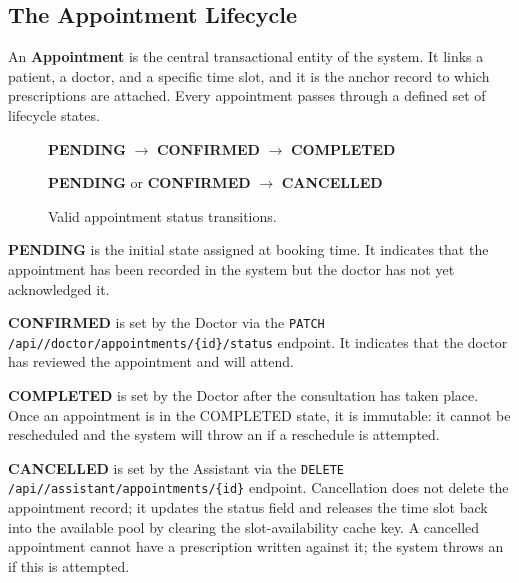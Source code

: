 \subsection{The Appointment Lifecycle}
\label{sec:domain-appointments}

An \textbf{Appointment} is the central transactional entity of the
system. It links a patient, a doctor, and a specific time slot, and it
is the anchor record to which prescriptions are attached. Every
appointment passes through a defined set of lifecycle states.

\begin{figure}[h!]
  \centering
  \begin{tcolorbox}[
    enhanced, arc=4pt, boxrule=1pt,
    colback=LightGray, colframe=RuleGray,
    left=12pt, right=12pt, top=10pt, bottom=10pt,
    width=0.92\linewidth,
  ]
  \centering
  \textcolor{PrimaryBlue}{\textbf{PENDING}}
  \quad\textcolor{AccentTeal}{$\longrightarrow$}\quad
  \textcolor{MethodPost}{\textbf{CONFIRMED}}
  \quad\textcolor{AccentTeal}{$\longrightarrow$}\quad
  \textcolor{MethodGet}{\textbf{COMPLETED}}

  \vspace{8pt}

  \textcolor{PrimaryBlue}{\textbf{PENDING}} \;or\;
  \textcolor{MethodPost}{\textbf{CONFIRMED}}
  \quad\textcolor{red!70!black}{$\longrightarrow$}\quad
  \textcolor{MethodDelete}{\textbf{CANCELLED}}
  \end{tcolorbox}
  \caption{Valid appointment status transitions.}
  \label{fig:appt-lifecycle}
\end{figure}

\textbf{PENDING} is the initial state assigned at booking time. It
indicates that the appointment has been recorded in the system but the
doctor has not yet acknowledged it.

\textbf{CONFIRMED} is set by the Doctor via the
\texttt{PATCH /api/\apiversion{}/doctor/appointments/\{id\}/status}
endpoint. It indicates that the doctor has reviewed the appointment and
will attend.

\textbf{COMPLETED} is set by the Doctor after the consultation has
taken place. Once an appointment is in the COMPLETED state, it is
immutable: it cannot be rescheduled and the system will throw an
 if a reschedule is
attempted.

\textbf{CANCELLED} is set by the Assistant via the
\texttt{DELETE /api/\apiversion{}/assistant/appointments/\{id\}}
endpoint. Cancellation does not delete the appointment record; it
updates the status field and releases the time slot back into the
available pool by clearing the slot-availability cache key. A cancelled
appointment cannot have a prescription written against it; the system
throws an  if this is
attempted.


